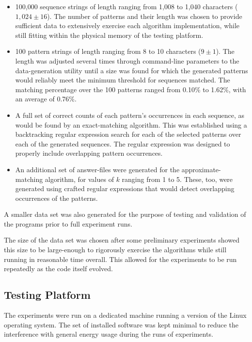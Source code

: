 \begin{itemize}
\item 100,000 sequence strings of length ranging from 1,008 to 1,040 characters ($1,024 \pm 16$). The number of patterns and their length was chosen to provide sufficient data to extensively exercise each algorithm implementation, while still fitting within the physical memory of the testing platform.
\item 100 pattern strings of length ranging from 8 to 10 characters ($9 \pm 1$). The length was adjusted several times through command-line parameters to the data-generation utility until a size was found for which the generated patterns would reliably meet the minimum threshold for sequences matched. The matching percentage over the 100 patterns ranged from 0.10\% to 1.62\%, with an average of 0.76\%.
\item A full set of correct counts of each pattern's occurrences in each sequence, as would be found by an exact-matching algorithm. This was established using a backtracking regular expression search for each of the selected patterns over each of the generated sequences. The regular expression was designed to properly include overlapping pattern occurrences.
\item An additional set of answer-files were generated for the approximate-matching algorithm, for values of $k$ ranging from 1 to 5. These, too, were generated using crafted regular expressions that would detect overlapping occurrences of the patterns.
\end{itemize}

A smaller data set was also generated for the purpose of testing and validation of the programs prior to full experiment runs.

The size of the data set was chosen after some preliminary experiments showed this size to be large-enough to rigorously exercise the algorithms while still running in reasonable time overall. This allowed for the experiments to be run repeatedly as the code itself evolved.

\subsection{Testing Platform}

The experiments were run on a dedicated machine running a version of the Linux operating system. The set of installed software was kept minimal to reduce the interference with general energy usage during the runs of experiments.

